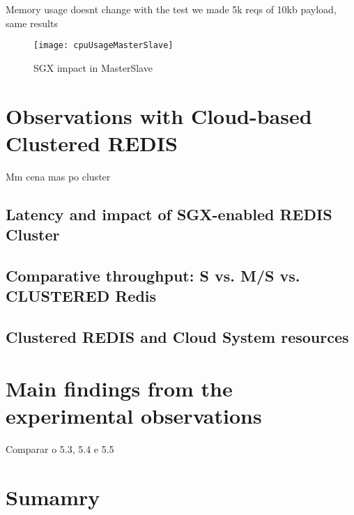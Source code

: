 Memory usage doesnt change with the test we made 5k reqs of 10kb payload, same results

\begin{figure}[htbp]
	\centering
	{\texttt{[image: cpuUsageMasterSlave]}}
	\caption{SGX impact in MasterSlave}
	\label{fig:cpuUsageMasterSlave}
\end{figure}

\section{Observations with Cloud-based Clustered REDIS}
Mm cena mas po cluster

\subsection{Latency and impact of SGX-enabled REDIS Cluster}

\subsection{Comparative throughput: S  vs. M/S vs. CLUSTERED Redis}

\subsection{Clustered REDIS and Cloud System resources}

\section{Main findings from the experimental observations}

Comparar o 5.3, 5.4 e 5.5

\section{Sumamry}


